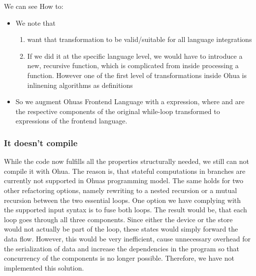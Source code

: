 We can see 
How to:
\begin{itemize}
    \item We note that 
    \begin{enumerate}
        \item want that transformation to be valid/suitable for all language integrations
        \item If we did it at the specific language level, we would have to introduce a new, recursive function, which is complicated from inside processing a function. However one of the first level of transformations inside Ohua is inlinening algorithms as  definitions  
    \end{enumerate}
    \item So we augment Ohuas Frontend Language with a  expression, where  and  are the respective components of the original while-loop transformed to expressions of the frontend language.
\end{itemize}

\subsubsection{It doesn't compile}

While the code now fulfills all the properties structurally needed, we still can not compile it with Ohua. The reason is, that stateful computations in branches are currently not supported in Ohuas programming model. The same holds for two other refactoring options, namely rewriting to a nested recursion or a mutual recursion between the two essential loops. 
One option we have complying with the supported input syntax is to fuse both loops. The result would be, that each loop goes through all three components. Since either the device or the store would not actually be part of the loop, these states would simply forward the data flow. However, this would be very inefficient, cause unnecessary overhead for the serialization of data and increase the dependencies in the program so that concurrency of the components is no longer possible. Therefore, we have not implemented this solution.

